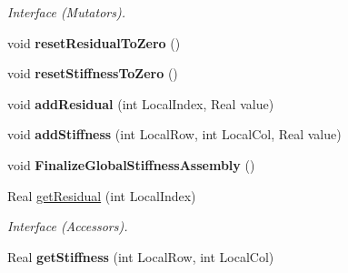 \begin{DoxyCompactItemize}
\begin{DoxyCompactList}\small\item\em Interface (Mutators). \item\end{DoxyCompactList}\item 
\hypertarget{structvoom_1_1_epetra_elliptic_result_a2789fe1e11ea64a594e29ce2413360a1}{
void {\bfseries resetResidualToZero} ()}
\label{structvoom_1_1_epetra_elliptic_result_a2789fe1e11ea64a594e29ce2413360a1}

\item 
\hypertarget{structvoom_1_1_epetra_elliptic_result_ab82ddea7dbe80852a4db04b040b83b63}{
void {\bfseries resetStiffnessToZero} ()}
\label{structvoom_1_1_epetra_elliptic_result_ab82ddea7dbe80852a4db04b040b83b63}

\item 
\hypertarget{structvoom_1_1_epetra_elliptic_result_af621e4868955b44a5b7d84b3b0094202}{
void {\bfseries addResidual} (int LocalIndex, Real value)}
\label{structvoom_1_1_epetra_elliptic_result_af621e4868955b44a5b7d84b3b0094202}

\item 
\hypertarget{structvoom_1_1_epetra_elliptic_result_aff28f290a66789dff23d47cf2b4d62ba}{
void {\bfseries addStiffness} (int LocalRow, int LocalCol, Real value)}
\label{structvoom_1_1_epetra_elliptic_result_aff28f290a66789dff23d47cf2b4d62ba}

\item 
\hypertarget{structvoom_1_1_epetra_elliptic_result_a33c14eb49019d5dbcc60dbdee0a93879}{
void {\bfseries FinalizeGlobalStiffnessAssembly} ()}
\label{structvoom_1_1_epetra_elliptic_result_a33c14eb49019d5dbcc60dbdee0a93879}

\item 
\hypertarget{structvoom_1_1_epetra_elliptic_result_affa111a21430ecfb7c79a98accf27f1f}{
Real \hyperlink{structvoom_1_1_epetra_elliptic_result_affa111a21430ecfb7c79a98accf27f1f}{getResidual} (int LocalIndex)}
\label{structvoom_1_1_epetra_elliptic_result_affa111a21430ecfb7c79a98accf27f1f}

\begin{DoxyCompactList}\small\item\em Interface (Accessors). \item\end{DoxyCompactList}\item 
\hypertarget{structvoom_1_1_epetra_elliptic_result_a40120a85cb6e4fbc5c6c0a9343012a71}{
Real {\bfseries getStiffness} (int LocalRow, int LocalCol)}
\label{structvoom_1_1_epetra_elliptic_result_a40120a85cb6e4fbc5c6c0a9343012a71}


\end{DoxyCompactItemize}
